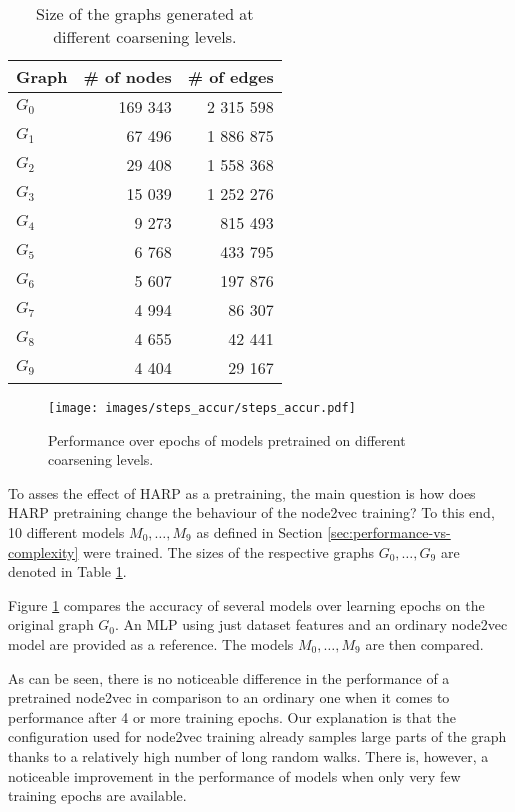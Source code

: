\begin{table}
  \caption{Size of the graphs generated at different coarsening levels.}
  \label{tab:graph-sizes}
  \begin{tabular}{lrr}
    \toprule
    Graph     & \# of nodes & \# of edges \\
    \midrule
    \( G_0 \) & 169 343     & 2 315 598   \\
    \( G_1 \) & 67 496      & 1 886 875   \\
    \( G_2 \) & 29 408      & 1 558 368   \\
    \( G_3 \) & 15 039      & 1 252 276   \\
    \( G_4 \) & 9 273       & 815 493     \\
    \( G_5 \) & 6 768       & 433 795     \\
    \( G_6 \) & 5 607       & 197 876     \\
    \( G_7 \) & 4 994       & 86 307      \\
    \( G_8 \) & 4 655       & 42 441      \\
    \( G_9 \) & 4 404       & 29 167      \\
    \bottomrule
  \end{tabular}
\end{table}

\begin{figure}
  \centering
  \texttt{[image: images/steps\_accur/steps\_accur.pdf]}
  \caption{Performance over epochs of models pretrained on different coarsening levels.}
  \label{fig:steps-accuracy}
\end{figure}

To asses the effect of HARP as a pretraining, the main question is how does HARP pretraining change the behaviour of the node2vec training? To this end, 10 different models \( M_0, \dots, M_9 \) as defined in Section \ref{sec:performance-vs-complexity} were trained. The sizes of the respective graphs \( G_0, \dots, G_9 \) are denoted in Table \ref{tab:graph-sizes}.

Figure \ref{fig:steps-accuracy} compares the accuracy of several models over learning epochs on the original graph \( G_0 \). An MLP using just dataset features and an ordinary node2vec model are provided as a reference. The models \( M_0, \dots, M_9 \) are then compared.

As can be seen, there is no noticeable difference in the performance of a pretrained node2vec in comparison to an ordinary one when it comes to performance after 4 or more training epochs. Our explanation is that the configuration used for node2vec training already samples large parts of the graph thanks to a relatively high number of long random walks. There is, however, a noticeable improvement in the performance of models when only very few training epochs are available.

